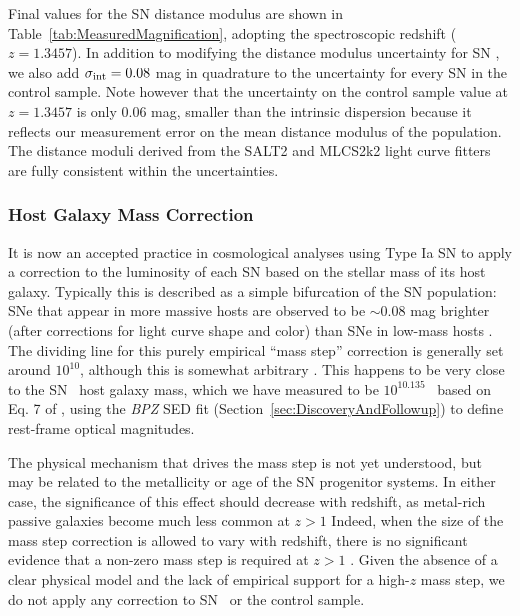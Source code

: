 Final values for the SN distance modulus are shown in
Table~\ref{tab:MeasuredMagnification}, adopting the spectroscopic
redshift ($z=1.3457$).  In addition to modifying the distance modulus
uncertainty for SN \tomas, we also add $\sigma_{\rm int}=0.08$ mag in
quadrature to the uncertainty for every SN in the control sample. Note
however that the uncertainty on the control sample value at $z=1.3457$
is only 0.06 mag, smaller than the intrinsic dispersion  because it reflects our measurement error on the mean
distance modulus of the population.  The distance moduli derived from
the SALT2 and MLCS2k2 light curve fitters are fully consistent within
the uncertainties.

\subsubsection{Host Galaxy Mass Correction}
\label{sec:HostGalaxyMassCorrection}

It is now an accepted practice in cosmological analyses using Type Ia
SN to apply a correction to the luminosity of each SN based on the
stellar mass of its host galaxy. Typically this is described as a
simple bifurcation of the SN population: SNe that appear in more
massive hosts are observed to be $\sim$0.08 mag brighter (after
corrections for light curve shape and color) than SNe in low-mass
hosts \citep{Kelly:2010,Sullivan:2010}.  The dividing line for this
purely empirical ``mass step'' correction is generally set around
$10^{10}$\Msun, although this is somewhat arbitrary \citep[see
e.g.][]{Betoule:2014}.  This happens to be very close to the
SN \tomas\ host galaxy mass, which we have measured to be
$10^{10.135}$ \Msun\ based on Eq. 7 of \citet{Taylor:2011}, using the
{\it BPZ} SED fit (Section~\ref{sec:DiscoveryAndFollowup}) to define rest-frame optical magnitudes.


The physical mechanism that drives the mass step is not yet
understood, but may be related to the metallicity or age of the SN
progenitor systems.  In either case, the significance of this effect
should decrease with redshift, as metal-rich passive galaxies become
much less common at $z>1$   Indeed, when the size of the
mass step correction is allowed to vary with redshift, there is no
significant evidence that a non-zero mass step is required at
$z>1$ \citep{Suzuki:2012,Shafer:2014,Betoule:2014}.  Given the
absence of a clear physical model and the lack of empirical support
for a high-$z$ mass step, we do not apply any correction to SN \tomas\
or the control sample.

